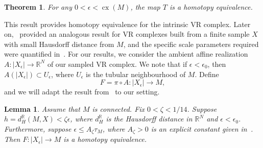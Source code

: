 \documentclass[11pt,reqno]{amsproc}
\numberwithin{equation}{section}
\newcommand{\R}{\mathbb{R}}
\newcommand{\cx}{\operatorname{cx}}
\newtheorem{lemma}[counter]{Lemma}
\newtheorem{theorem}[counter]{Theorem}
\theoremstyle{definition}
\theoremstyle{plain}
\begin{document}
    \begin{theorem}{\cite{hausmann1995vietorisrips}}
        For any $0 < \epsilon < \cx(M)$, the map $T$ is a homotopy equivalence.
    \end{theorem}

    This result provides homotopy equivalence for the intrinsic VR complex. Later on,~\cite{latschev_vietoris-rips_2001} provided an analogous result for VR complexes built from a finite sample $X$ with small Hausdorff distance from $M$, and the specific scale parameters required were quantified in~\cite{majhi_demystifying_2024}. For our results, we consider the ambient affine realization $A: |X_\epsilon| \to \R^N$ of our sampled VR complex. We note that if $\epsilon < \epsilon_0$, then $A(|X_\epsilon|) \subset U_\epsilon$, where $U_\epsilon$ is the tubular neighbourhood of $M$. Define
    \begin{equation}
        F = \pi \circ A : |X_\epsilon| \to M,
    \end{equation}
    and we will adapt the result from~\cite{majhi_demystifying_2024} to our setting. 
    



    \begin{lemma} \label{lem:affine_projection_homotopy_equivalence}
        Assume that $M$ is connected.  Fix $0<\zeta<1/14$.  Suppose $h=d_H^\R(M,X)<\zeta\epsilon$, where $d_H^\R$ is the Hausdorff distance in $\R^N$ and  $\epsilon<\epsilon_0$. Furthermore, suppose $\epsilon \leq A_\zeta \tau_M$, where $A_\zeta > 0$ is an explicit constant given in~\cite[Theorem 18]{majhi_demystifying_2024}.
        Then $F:|X_\epsilon|\to M$ is a homotopy equivalence.
    \end{lemma}
\end{document}
